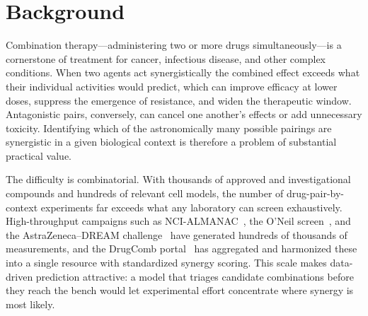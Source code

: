 \documentclass{bmcart}
\begin{document}
\begin{frontmatter}
\begin{abstractbox}
\begin{abstract}
Useful synergy triage is achievable for known entities without molecular features, but standard splits
partly measure memorization of entity-specific base rates and can materially overstate cold-start
deployment performance. The benchmark provides a leakage-controlled lower bound against which richer
molecular and omics models can be measured, and argues that cold-start evaluation should be reported
alongside conventional random or grouped splits.
\end{abstract}

\begin{keyword}
\end{keyword}

\end{abstractbox}

\end{frontmatter}

\section*{Background}
Combination therapy---administering two or more drugs simultaneously---is a cornerstone of treatment
for cancer, infectious disease, and other complex conditions. When two agents act synergistically the
combined effect exceeds what their individual activities would predict, which can improve efficacy at
lower doses, suppress the emergence of resistance, and widen the therapeutic window. Antagonistic
pairs, conversely, can cancel one another's effects or add unnecessary toxicity. Identifying which of
the astronomically many possible pairings are synergistic in a given biological context is therefore a
problem of substantial practical value.

The difficulty is combinatorial. With thousands of approved and investigational compounds and
hundreds of relevant cell models, the number of drug-pair-by-context experiments far exceeds what any
laboratory can screen exhaustively. High-throughput campaigns such as NCI-ALMANAC~\cite{holbeck2017},
the O'Neil screen~\cite{oneil2016}, and the AstraZeneca--DREAM challenge~\cite{menden2019} have
generated hundreds of thousands of measurements, and the DrugComb portal~\cite{zagidullin2019,
zheng2021} has aggregated and harmonized these into a single resource with standardized synergy
scoring. This scale makes data-driven prediction attractive: a model that triages candidate
combinations before they reach the bench would let experimental effort concentrate where synergy is
most likely.
\end{document}
